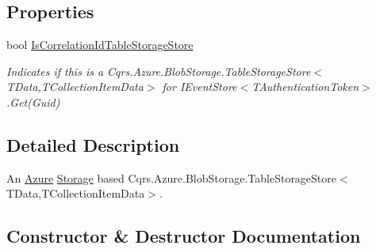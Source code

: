 \subsection*{Properties}
\begin{DoxyCompactItemize}
\item 
bool \hyperlink{classCqrs_1_1Azure_1_1BlobStorage_1_1Events_1_1TableStorageEventStore_1_1RawTableStorageEventStore_a566f4821980b2ca77f12f88d010beff2_a566f4821980b2ca77f12f88d010beff2}{Is\+Correlation\+Id\+Table\+Storage\+Store}
\begin{DoxyCompactList}\small\item\em Indicates if this is a Cqrs.\+Azure.\+Blob\+Storage.\+Table\+Storage\+Store$<$\+T\+Data,\+T\+Collection\+Item\+Data$>$ for I\+Event\+Store$<$\+T\+Authentication\+Token$>$.\+Get(\+Guid) \end{DoxyCompactList}\end{DoxyCompactItemize}


\subsection{Detailed Description}
An \hyperlink{namespaceCqrs_1_1Azure}{Azure} \hyperlink{namespaceCqrs_1_1Azure_1_1Storage}{Storage} based Cqrs.\+Azure.\+Blob\+Storage.\+Table\+Storage\+Store$<$\+T\+Data,\+T\+Collection\+Item\+Data$>$. 



\subsection{Constructor \& Destructor Documentation}
\mbox{\label{classCqrs_1_1Azure_1_1BlobStorage_1_1Events_1_1TableStorageEventStore_1_1RawTableStorageEventStore_aa6aa02462732467a16148e0d094cd308_aa6aa02462732467a16148e0d094cd308}} 
